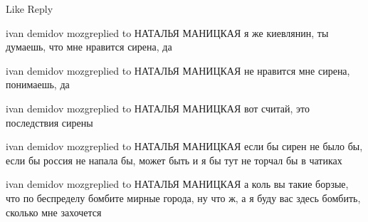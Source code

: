     Like
    Reply

ivan demidov mozgreplied to НАТАЛЬЯ МАНИЦКАЯ
я же киевлянин, ты думаешь, что мне нравится сирена, да

ivan demidov mozgreplied to НАТАЛЬЯ МАНИЦКАЯ
не нравится мне сирена, понимаешь, да

ivan demidov mozgreplied to НАТАЛЬЯ МАНИЦКАЯ
вот считай, это последствия сирены

ivan demidov mozgreplied to НАТАЛЬЯ МАНИЦКАЯ
если бы сирен не было бы, если бы россия не напала бы, может быть и я бы тут не торчал бы в чатиках

ivan demidov mozgreplied to НАТАЛЬЯ МАНИЦКАЯ
а коль вы такие борзые, что по беспределу бомбите мирные города, ну что ж, а я буду вас здесь бомбить, сколько мне захочется













